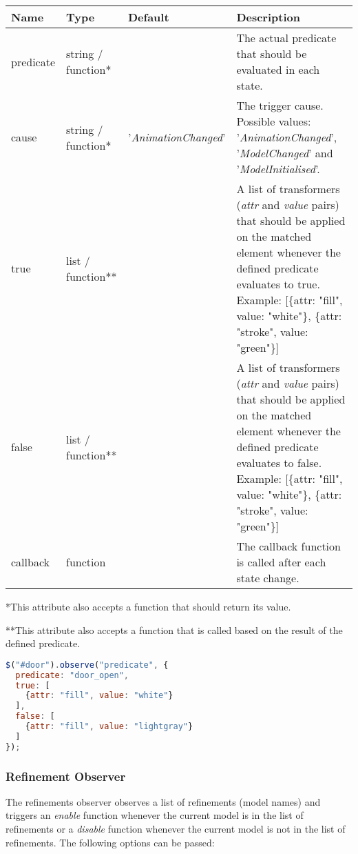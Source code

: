 \begin{tabular}{ l l l p{7cm} }
  \textbf{Name} & \textbf{Type} & \textbf{Default} & \textbf{Description} \\
  \hline\noalign{\medskip}
  predicate & string / function* & & The actual predicate that should be evaluated in each state.\\
  \hline\noalign{\medskip}
  cause & string / function* & '\textit{AnimationChanged}' & The trigger cause. Possible values: '\textit{AnimationChanged}', '\textit{ModelChanged}' and '\textit{ModelInitialised}'. \\
  \hline\noalign{\medskip}
  true & list / function** & & A list of transformers (\textit{attr} and \textit{value} pairs) that should be applied on the matched element whenever the defined predicate evaluates to true. Example: 
  [\{attr: "fill", value: "white"\}, \{attr: "stroke", value: "green"\}]\\
  \hline\noalign{\medskip}
  false & list / function** & & A list of transformers (\textit{attr} and \textit{value} pairs) that should be applied on the matched element whenever the defined predicate evaluates to false. Example: 
  [\{attr: "fill", value: "white"\}, \{attr: "stroke", value: "green"\}]\\
  \hline\noalign{\medskip}
  callback & function &  & The callback function is called after each state change.
\end{tabular}

*This attribute also accepts a function that should return its value.

**This attribute also accepts a function that is called based on the result of the defined predicate.

\begin{lstlisting}[language=JavaScript]
$("#door").observe("predicate", {
  predicate: "door_open",
  true: [
    {attr: "fill", value: "white"}
  ],
  false: [
    {attr: "fill", value: "lightgray"}
  ]
});
\end{lstlisting}

\subsubsection{Refinement Observer}

The refinements observer observes a list of refinements (model names) and triggers an \textit{enable} function whenever the current model is in the list of refinements or a \textit{disable} function whenever the current model is not in the list of refinements.
The following options can be passed:

